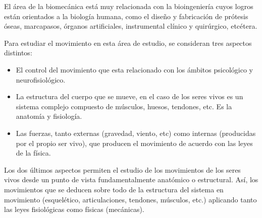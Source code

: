 \documentclass[a4paper]{article}
\begin{document}
El área de la biomecánica está muy relacionada con la bioingeniería cuyos logros están orientados a la biología humana, como el diseño y fabricación de prótesis óseas, marcapasos, órganos artificiales, instrumental clínico y quirúrgico, etcétera.

Para estudiar el movimiento en esta área de estudio, se consideran tres aspectos distintos:
\begin{itemize}
    \item El control del movimiento que esta relacionado con los ámbitos psicológico y neurofisiológico.
\end{itemize}
\begin{itemize}
    \item La estructura del cuerpo que se mueve, en el caso de los seres vivos es un sistema complejo compuesto de músculos, huesos, tendones, etc. Es la anatomía y fisiología.
\end{itemize}
\begin{itemize}
    \item Las fuerzas, tanto externas (gravedad, viento, etc) como internas (producidas por el propio ser vivo), que producen el movimiento de acuerdo con las leyes de la física.
\end{itemize}
Los dos últimos aspectos permiten el estudio de los movimientos de los seres vivos desde un punto de vista fundamentalmente anatómico o estructural. Así, los movimientos que se deducen sobre todo de la estructura del sistema en movimiento (esquelético, articulaciones, tendones, músculos, etc.) aplicando tanto las leyes fisiológicas como físicas (mecánicas). 
\end{document}
